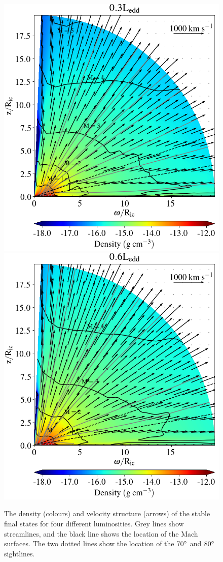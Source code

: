 \documentclass[a4paper,fleqn,usenatbib]{mnras}
\begin{document}
\begin{figure}
\includegraphics[width=\columnwidth]{figures/fig1c_density.png}
\includegraphics[width=\columnwidth]{figures/fig1d_density.png}
\caption{The density (colours) and velocity structure (arrows) of the stable final states for 
four different luminosities. Grey lines show streamlines, and the black line shows the location of the Mach surfaces. The two dotted
lines show the location of the $70\degree$ and $80\degree$ sightlines.}
\label{figure:wind_small_image}
\end{figure}
\end{document}
